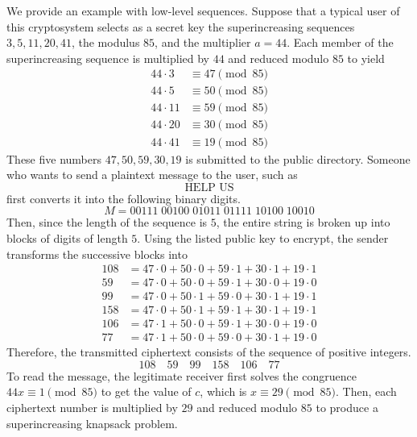 \documentclass{article}
\newcounter{example}[section]
\begin{document}
We provide an example with low-level sequences. Suppose that a typical user of this cryptosystem selects as a secret key the superincreasing sequences $3, 5, 11, 20, 41$, the modulus $85$, and the multiplier $a = 44$. Each member of the superincreasing sequence is multiplied by $44$ and reduced modulo $85$ to yield 
\begin{align*}
    44 \cdot 3 &\equiv 47 \pmod{85} \\
    44 \cdot 5 &\equiv 50 \pmod{85} \\
    44 \cdot 11 &\equiv 59 \pmod{85} \\
    44 \cdot 20 &\equiv 30 \pmod{85} \\
    44 \cdot 41 &\equiv 19 \pmod{85} 
\end{align*}
These five numbers $47, 50, 59, 30, 19$ is submitted to the public directory. Someone who wants to send a plaintext message to the user, such as 
\begin{equation}
  \text{HELP US}
\end{equation}
first converts it into the following binary digits.
\begin{equation}
  M = 00111\;00100\;01011\;01111\;10100\;10010
\end{equation}
Then, since the length of the sequence is $5$, the entire string is broken up into blocks of digits of length $5$. Using the listed public key to encrypt, the sender transforms the successive blocks into 
\begin{align*}
    108 & = 47 \cdot 0 + 50 \cdot 0 + 59 \cdot 1 + 30 \cdot 1 + 19 \cdot 1 \\
    59 & = 47 \cdot 0 + 50 \cdot 0 + 59 \cdot 1 + 30 \cdot 0 + 19 \cdot 0 \\
    99 & = 47 \cdot 0 + 50 \cdot 1 + 59 \cdot 0 + 30 \cdot 1 + 19 \cdot 1 \\
    158 & = 47 \cdot 0 + 50 \cdot 1 + 59 \cdot 1 + 30 \cdot 1 + 19 \cdot 1 \\
    106 & = 47 \cdot 1 + 50 \cdot 0 + 59 \cdot 1 + 30 \cdot 0 + 19 \cdot 0 \\
    77 & = 47 \cdot 1 + 50 \cdot 0 + 59 \cdot 0 + 30 \cdot 1 + 19 \cdot 0
\end{align*}
Therefore, the transmitted ciphertext consists of the sequence of positive integers. 
\begin{equation}
  108\quad59\quad99\quad158\quad106\quad77
\end{equation}
To read the message, the legitimate receiver first solves the congruence $44x \equiv 1 \pmod{85}$ to get the value of $c$, which is $x \equiv 29 \pmod{85}$. Then, each ciphertext number is multiplied by $29$ and reduced modulo $85$ to produce a superincreasing knapsack problem. 
\end{document}
